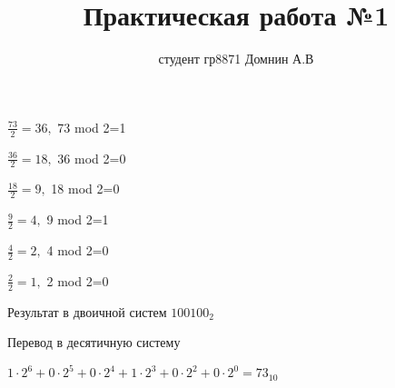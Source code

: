\documentclass[a4paper,11pt]{article}
\title{Практическая работа №1}
\author{студент гр8871 Домнин А.В }
\begin{document}
\maketitle
$
\frac {73}{2}=36,
$
 {73} mod {2}=1 

$
\frac {36}{2}=18,
$
 {36} mod {2}=0 

$
\frac {18}{2}=9,
$
 {18} mod {2}=0 

$
\frac {9}{2}=4,
$
 {9} mod {2}=1 

$
\frac {4}{2}=2,
$
 {4} mod {2}=0 

$
\frac {2}{2}=1,
$
 {2} mod {2}=0 

Результат в двоичной систем  
$100100_{2}$

Перевод в десятичную систему

$1\cdot2^6+0\cdot2^5+0\cdot2^4+1\cdot2^3+0\cdot2^2+0\cdot2^0=73_{10}$
\end{document}
